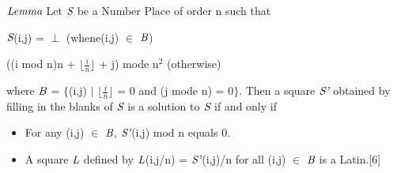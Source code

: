 \documentclass[a4paper]{report}
\begin{document}
\vspace{3mm}

\begin{center}
$\emph{Lemma}$ Let $\emph{S}$ be a Number Place of order n such that 


$\emph{S}$(i,j) = $\perp$ (whene(i,j) $\in$ $\emph{B}$)

((i mod n)n + $\lfloor$$\frac{i}{n}$$\rfloor$ + j) mode n$^{2}$ (otherwise)

where $\emph{B}$ = $\lbrace$(i,j) $\vert$ $\lfloor$$\frac{i}{n}$$\rfloor$ = 0 and (j mode n) = 0$\rbrace$. Then a square $\emph{S'}$ obtained by filling in the blanks of $\emph{S}$ is a solution to $\emph{S}$ if and only if 
\end{center}
\begin{itemize}
\item
For any (i,j) $\in$ $\emph{B}$, $\emph{S'}$(i,j) mod n equals 0.
\item
A square $\emph{L}$ defined by $\emph{L}$(i,j/n) = $\emph{S'}$(i,j)/n for all (i,j) $\in$ $\emph{B}$ is a Latin.[6]
\end{itemize}
\end{document}
